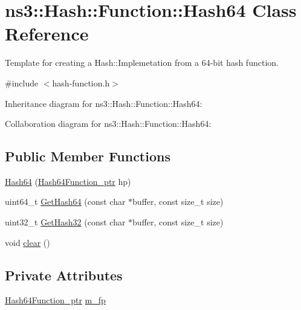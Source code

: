 \hypertarget{classns3_1_1Hash_1_1Function_1_1Hash64}{}\section{ns3\+:\+:Hash\+:\+:Function\+:\+:Hash64 Class Reference}
\label{classns3_1_1Hash_1_1Function_1_1Hash64}


Template for creating a Hash\+::\+Implemetation from a 64-\/bit hash function.  




{\ttfamily \#include $<$hash-\/function.\+h$>$}



Inheritance diagram for ns3\+:\+:Hash\+:\+:Function\+:\+:Hash64\+:


Collaboration diagram for ns3\+:\+:Hash\+:\+:Function\+:\+:Hash64\+:
\subsection*{Public Member Functions}
\begin{DoxyCompactItemize}
\item 
\hyperlink{classns3_1_1Hash_1_1Function_1_1Hash64_af0ba42bdb931a281568fd1413b9b0e10}{Hash64} (\hyperlink{group__hash_gab363931a84d780a98d09dd85db36a666}{Hash64\+Function\+\_\+ptr} hp)
\item 
uint64\+\_\+t \hyperlink{classns3_1_1Hash_1_1Function_1_1Hash64_ad224a6245ca9803384d95601bebb62fb}{Get\+Hash64} (const char $\ast$buffer, const size\+\_\+t size)
\item 
uint32\+\_\+t \hyperlink{classns3_1_1Hash_1_1Function_1_1Hash64_a2bd1e57df6719811c95cb1a3340ea0a0}{Get\+Hash32} (const char $\ast$buffer, const size\+\_\+t size)
\item 
void \hyperlink{classns3_1_1Hash_1_1Function_1_1Hash64_abd5686e233ae1e7f8328a77def767ad9}{clear} ()
\end{DoxyCompactItemize}
\subsection*{Private Attributes}
\begin{DoxyCompactItemize}
\item 
\hyperlink{group__hash_gab363931a84d780a98d09dd85db36a666}{Hash64\+Function\+\_\+ptr} \hyperlink{classns3_1_1Hash_1_1Function_1_1Hash64_a4455c8ff97a1b387399bacc5584b1414}{m\+\_\+fp}
\end{DoxyCompactItemize}
